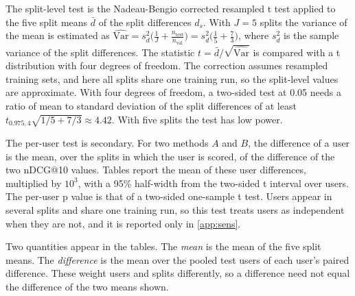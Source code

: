 The split-level test is the Nadeau-Bengio corrected resampled t test \citep{nadeau2003} applied to the five split means $\bar d$ of the split
differences $d_s$. With $J=5$ splits the variance of the mean is estimated as
$\widehat{\mathrm{Var}}=s_d^2\bigl(\tfrac1J+\tfrac{n_{\mathrm{test}}}{n_{\mathrm{val}}}\bigr)=s_d^2\bigl(\tfrac15+\tfrac73\bigr)$, where $s_d^2$ is the
sample variance of the split differences. The statistic $t=\bar d/\sqrt{\widehat{\mathrm{Var}}}$ is compared with a t distribution with four
degrees of freedom. The correction assumes resampled training sets, and here all splits share one training run, so the split-level values are
approximate. With four degrees of freedom, a two-sided test at 0.05 needs a ratio of mean to standard deviation of the split differences of at
least $t_{0.975,4}\sqrt{1/5+7/3}\approx4.42$. With five splits the test has low power.

The per-user test is secondary. For two methods $A$ and $B$, the difference of a user is the mean, over the splits in which the user is scored,
of the difference of the two nDCG@10 values. Tables report the mean of these user differences, multiplied by $10^{3}$, with a 95\% half-width from
the two-sided t interval over users. The per-user p value is that of a two-sided one-sample t test. Users appear in several splits and share one
training run, so this test treats users as independent when they are not, and it is reported only in \ref{app:sens}.

Two quantities appear in the tables. The \emph{mean} is the mean of the five split means. The \emph{difference} is the mean over the pooled test
users of each user's paired difference. These weight users and splits differently, so a difference need not equal the difference of the two means
shown.

